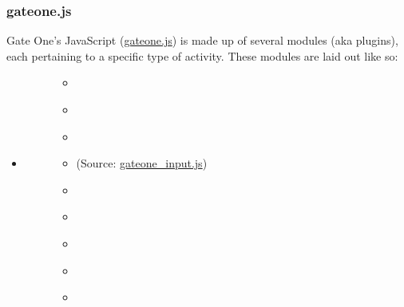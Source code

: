 \documentclass[letterpaper,10pt,openany]{sphinxmanual}
\begin{document}
\subsubsection{gateone.js}
\label{Developer/js_gateone:gateone-javascript}\label{Developer/js_gateone::doc}\label{Developer/js_gateone:gateone-js}
Gate One's JavaScript (\href{https://github.com/liftoff/GateOne/blob/master/gateone/static/gateone.js}{gateone.js}) is made up of several modules (aka plugins), each pertaining to a specific type of activity.  These modules are laid out like so:
\begin{itemize}
\item {} \begin{description}
\item[{{\hyperref[Developer/js_gateone:GateOne]{}}}] \leavevmode\begin{itemize}
\item {} 
{\hyperref[Developer/js_gateone:GateOne.Base]{}}

\item {} 
{\hyperref[Developer/js_gateone:GateOne.Events]{}}

\item {} 
{\hyperref[Developer/js_gateone:GateOne.i18n]{}}

\item {} 
{\hyperref[Developer/js_gateone:GateOne.Input]{}} (Source: \href{https://github.com/liftoff/GateOne/blob/master/gateone/static/gateone\_input.js}{gateone\_input.js})

\item {} 
{\hyperref[Developer/js_gateone:GateOne.Net]{}}

\item {} 
{\hyperref[Developer/js_gateone:GateOne.Storage]{}}

\item {} 
{\hyperref[Developer/js_gateone:GateOne.Visual]{}}

\item {} 
{\hyperref[Developer/js_gateone:GateOne.User]{}}

\item {} 
{\hyperref[Developer/js_gateone:GateOne.Utils]{}}

\end{itemize}

\end{description}

\end{itemize}
\end{document}
